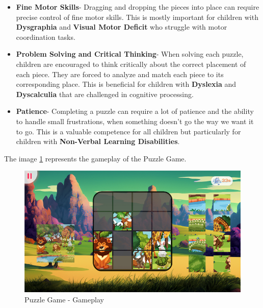 \begin{itemize}
    \item \textbf{Fine Motor Skills}- Dragging and dropping the pieces into place can require precise control of fine motor skills. This is mostly important for children with \textbf{Dysgraphia} and \textbf{Visual Motor Deficit} who struggle with motor coordination tasks.

    \item \textbf{Problem Solving and Critical Thinking}- When solving each puzzle, children are encouraged to think critically about the correct placement of each piece. They are forced to analyze and match each piece to its corresponding place. This is beneficial for children with \textbf{Dyslexia} and \textbf{Dyscalculia} that are challenged in cognitive processing.
    
    \item \textbf{Patience}- Completing a puzzle can require a lot of patience and the ability to handle small frustrations, when something doesn't go the way we want it to go. This is a valuable competence for all children but particularly for children with \textbf{Non-Verbal Learning Disabilities}.
\end{itemize}

The image \ref{fig:puzzleGameplay} represents the gameplay of the Puzzle Game.

\begin{figure}[H]
    \centering
    \includegraphics[scale=0.45]{Chapters/gameplay/PuzzleGame.jpg}
    \caption{Puzzle Game - Gameplay}
    \label{fig:puzzleGameplay}    
\end{figure}